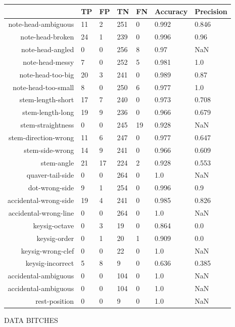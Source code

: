   \begin{figure}
    \centering
    \begin{subtable}[b]{\linewidth}
      \begin{tabularx}{\textwidth}{r | XXXXXX}
                                  & TP & FP & TN & FN & Accuracy & Precision \\
        \midrule
              note-head-ambiguous & 11 & 2& 251& 0 & 0.992 & 0.846 \\
                 note-head-broken & 24 & 1& 239& 0 & 0.996 & 0.96 \\
                 note-head-angled & 0 & 0& 256& 8 & 0.97 & NaN \\
                  note-head-messy & 7 & 0& 252& 5 & 0.981 & 1.0 \\
                note-head-too-big & 20 & 3& 241& 0 & 0.989 & 0.87 \\
              note-head-too-small & 8 & 0& 250& 6 & 0.977 & 1.0 \\
                stem-length-short & 17 & 7& 240& 0 & 0.973 & 0.708 \\
                 stem-length-long & 19 & 9& 236& 0 & 0.966 & 0.679 \\
                stem-straightness & 0 & 0& 245& 19 & 0.928 & NaN \\
             stem-direction-wrong & 11 & 6& 247& 0 & 0.977 & 0.647 \\
                  stem-side-wrong & 14 & 9& 241& 0 & 0.966 & 0.609 \\
                       stem-angle & 21 & 17& 224& 2 & 0.928 & 0.553 \\
                 quaver-tail-side & 0 & 0& 264& 0 & 1.0 & NaN \\
                   dot-wrong-side & 9 & 1& 254& 0 & 0.996 & 0.9 \\
            accidental-wrong-side & 19 & 4& 241& 0 & 0.985 & 0.826 \\
            accidental-wrong-line & 0 & 0& 264& 0 & 1.0 & NaN \\
                    keysig-octave & 0 & 3& 19& 0 & 0.864 & 0.0 \\
                     keysig-order & 0 & 1& 20& 1 & 0.909 & 0.0 \\
                keysig-wrong-clef & 0 & 0& 22& 0 & 1.0 & NaN \\
                 keysig-incorrect & 5 & 8& 9& 0 & 0.636 & 0.385 \\
             accidental-ambiguous & 0 & 0& 104& 0 & 1.0 & NaN \\
             accidental-ambiguous & 0 & 0& 104& 0 & 1.0 & NaN \\
                    rest-position & 0 & 0& 9& 0 & 1.0 & NaN \\

      \end{tabularx}
    \end{subtable}

    \caption{DATA BITCHES}
    \label{table:results-matrix}
  \end{figure}


